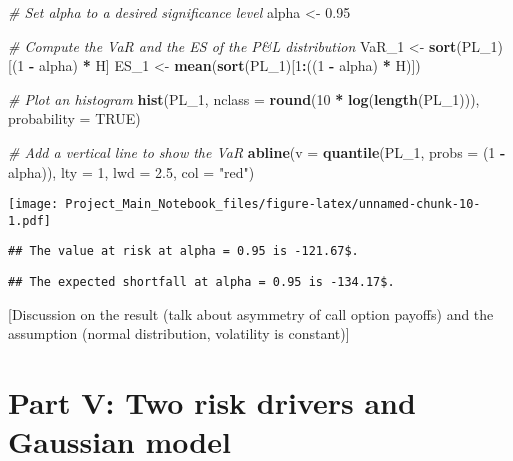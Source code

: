 \documentclass[]{article}
\newenvironment{Shaded}{\begin{snugshade}}{\end{snugshade}}
\newcommand{\CommentTok}[1]{\textcolor[rgb]{0.56,0.35,0.01}{\textit{#1}}}
\newcommand{\DataTypeTok}[1]{\textcolor[rgb]{0.13,0.29,0.53}{#1}}
\newcommand{\DecValTok}[1]{\textcolor[rgb]{0.00,0.00,0.81}{#1}}
\newcommand{\FloatTok}[1]{\textcolor[rgb]{0.00,0.00,0.81}{#1}}
\newcommand{\KeywordTok}[1]{\textcolor[rgb]{0.13,0.29,0.53}{\textbf{#1}}}
\newcommand{\NormalTok}[1]{#1}
\newcommand{\OperatorTok}[1]{\textcolor[rgb]{0.81,0.36,0.00}{\textbf{#1}}}
\newcommand{\OtherTok}[1]{\textcolor[rgb]{0.56,0.35,0.01}{#1}}
\newcommand{\StringTok}[1]{\textcolor[rgb]{0.31,0.60,0.02}{#1}}
\begin{document}
\begin{Shaded}
\begin{Highlighting}[]
\CommentTok{# Set alpha to a desired significance level}
\NormalTok{alpha <-}\StringTok{ }\FloatTok{0.95}

\CommentTok{# Compute the VaR and the ES of the P&L distribution}
\NormalTok{VaR_}\DecValTok{1}\NormalTok{ <-}\StringTok{ }\KeywordTok{sort}\NormalTok{(PL_}\DecValTok{1}\NormalTok{)[(}\DecValTok{1} \OperatorTok{-}\StringTok{ }\NormalTok{alpha) }\OperatorTok{*}\StringTok{ }\NormalTok{H]}
\NormalTok{ES_}\DecValTok{1}\NormalTok{  <-}\StringTok{ }\KeywordTok{mean}\NormalTok{(}\KeywordTok{sort}\NormalTok{(PL_}\DecValTok{1}\NormalTok{)[}\DecValTok{1}\OperatorTok{:}\NormalTok{((}\DecValTok{1} \OperatorTok{-}\StringTok{ }\NormalTok{alpha) }\OperatorTok{*}\StringTok{ }\NormalTok{H)])}

\CommentTok{# Plot an histogram}
\KeywordTok{hist}\NormalTok{(PL_}\DecValTok{1}\NormalTok{, }\DataTypeTok{nclass =} \KeywordTok{round}\NormalTok{(}\DecValTok{10} \OperatorTok{*}\StringTok{ }\KeywordTok{log}\NormalTok{(}\KeywordTok{length}\NormalTok{(PL_}\DecValTok{1}\NormalTok{))), }\DataTypeTok{probability =} \OtherTok{TRUE}\NormalTok{)}

\CommentTok{# Add a vertical line to show the VaR}
\KeywordTok{abline}\NormalTok{(}\DataTypeTok{v   =} \KeywordTok{quantile}\NormalTok{(PL_}\DecValTok{1}\NormalTok{, }\DataTypeTok{probs =}\NormalTok{ (}\DecValTok{1} \OperatorTok{-}\StringTok{ }\NormalTok{alpha)),}
       \DataTypeTok{lty =} \DecValTok{1}\NormalTok{,}
       \DataTypeTok{lwd =} \FloatTok{2.5}\NormalTok{,}
       \DataTypeTok{col =} \StringTok{"red"}\NormalTok{)}
\end{Highlighting}
\end{Shaded}

\texttt{[image: Project\_Main\_Notebook\_files/figure-latex/unnamed-chunk-10-1.pdf]}

\begin{verbatim}
## The value at risk at alpha = 0.95 is -121.67$.
\end{verbatim}

\begin{verbatim}
## The expected shortfall at alpha = 0.95 is -134.17$.
\end{verbatim}

{[}Discussion on the result (talk about asymmetry of call option
payoffs) and the assumption (normal distribution, volatility is
constant){]}

\hypertarget{part-v-two-risk-drivers-and-gaussian-model}{%
\section{Part V: Two risk drivers and Gaussian
model}\label{part-v-two-risk-drivers-and-gaussian-model}}
\end{document}
